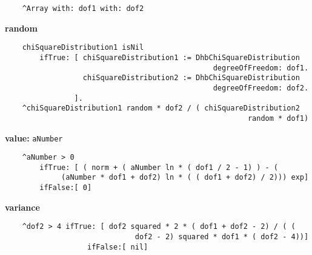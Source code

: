 \begin{verbatim}
    ^Array with: dof1 with: dof2

\end{verbatim}
{\bf random}
\begin{verbatim}
    chiSquareDistribution1 isNil
        ifTrue: [ chiSquareDistribution1 := DhbChiSquareDistribution 
                                                degreeOfFreedom: dof1.
                  chiSquareDistribution2 := DhbChiSquareDistribution 
                                                degreeOfFreedom: dof2.
                ].
    ^chiSquareDistribution1 random * dof2 / ( chiSquareDistribution2 
                                                        random * dof1)

\end{verbatim}
{\bf value:} {\tt aNumber}
\begin{verbatim}
    ^aNumber > 0
        ifTrue: [ ( norm + ( aNumber ln * ( dof1 / 2 - 1) ) - ( 
             (aNumber * dof1 + dof2) ln * ( ( dof1 + dof2) / 2))) exp]
        ifFalse:[ 0]

\end{verbatim}
{\bf variance}
\begin{verbatim}
    ^dof2 > 4 ifTrue: [ dof2 squared * 2 * ( dof1 + dof2 - 2) / ( ( 
                              dof2 - 2) squared * dof1 * ( dof2 - 4))]
                   ifFalse:[ nil]

\end{verbatim}

